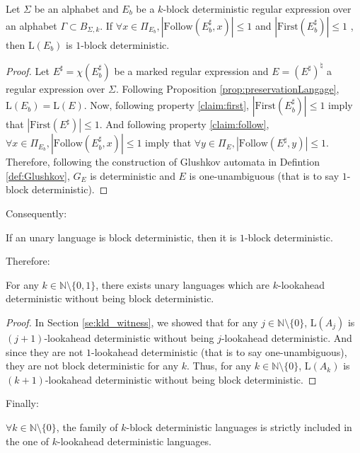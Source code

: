 \documentclass{llncs}
\begin{document}
\begin{lemma}
	Let $\Sigma$ be an alphabet and $E_b$ be a $k$-block deterministic regular expression over an alphabet $\Gamma \subset B_{\Sigma, k}$.
	If $\forall x \in \Pi_{E_b}, | \mathrm{Follow}(E_b^{\sharp}, x)| \leq 1$ and  $|\mathrm{First}(E_b^{\sharp})| \leq 1$ , then $\mathrm{L}(E_b)$ is $1$-block deterministic.
\end{lemma}
\begin{proof}
	Let $E^{\sharp} = \chi(E_b^{\sharp})$ be a marked regular expression and $E = (E^{\sharp})^{\natural}$ a regular expression over $\Sigma$.
	Following Proposition \ref{prop:preservationLangage}, $\mathrm{L}(E_b) = \mathrm{L}(E)$.
	Now, following property \eqref{claim:first}, $|\mathrm{First}(E_b^{\sharp})| \leq 1$ imply that $|\mathrm{First}(E^{\sharp})| \leq 1$.
	And following property \eqref{claim:follow}, $\forall x \in \Pi_{E_b}, |\mathrm{Follow}(E_b^{\sharp}, x)| \leq 1$ imply that $\forall y \in \Pi_E, |\mathrm{Follow}(E^{\sharp}, y)| \leq 1$.
	Therefore, following the construction of Glushkov automata in Defintion \ref{def:Glushkov}, $G_E$ is deterministic and $E$ is one-unambiguous (that is to say $1$-block deterministic).
\end{proof}

	Consequently:

\begin{theorem}
	If an unary language is block deterministic, then it is $1$-block deterministic.
\end{theorem}

	Therefore:

\begin{proposition}
	For any $k \in \mathbb{N} \setminus \{0, 1\}$, there exists unary languages which are $k$-lookahead deterministic without being block deterministic.	
\end{proposition}
\begin{proof}
	In Section \ref{se:kld_witness}, we showed that for any $j \in \mathbb{N} \setminus \{0\}$, $\mathrm{L}(A_j)$ is $(j+1)$-lookahead deterministic without being $j$-lookahead deterministic.
	And since they are not $1$-lookahead deterministic (that is to say one-unambiguous), they are not block deterministic for any $k$.
	Thus, for any $k \in \mathbb{N} \setminus \{0\}$, $\mathrm{L}(A_k)$ is $(k+1)$-lookahead deterministic without being block deterministic.
\end{proof}

	Finally:

\begin{theorem}
	$\forall k \in \mathbb{N} \setminus \{0\}$, the family of $k$-block deterministic languages is strictly included in the one of $k$-lookahead deterministic languages.
\end{theorem}
\end{document}
